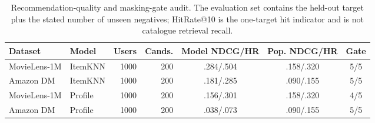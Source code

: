 \begin{table}[t]
\centering\scriptsize
\setlength{\tabcolsep}{3pt}
\caption{Recommendation-quality and masking-gate audit. The evaluation set contains the held-out target plus the stated number of unseen negatives; HitRate@10 is the one-target hit indicator and is not catalogue retrieval recall.}
\label{tab:recommendation-quality}
\begin{tabular}{@{}llrrccc@{}}
\toprule
Dataset & Model & Users & Cands. & Model NDCG/HR & Pop. NDCG/HR & Gate \\
\midrule
MovieLens-1M & ItemKNN & 1000 & 200 & .284/.504 & .158/.320 & 5/5 \\
Amazon DM & ItemKNN & 1000 & 200 & .181/.285 & .090/.155 & 5/5 \\
MovieLens-1M & Profile & 1000 & 200 & .156/.301 & .158/.320 & 4/5 \\
Amazon DM & Profile & 1000 & 200 & .038/.073 & .090/.155 & 5/5 \\
\bottomrule
\end{tabular}
\end{table}
